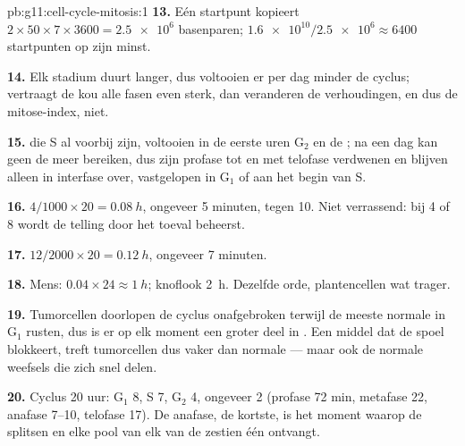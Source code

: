 \begin{solution}{pb:g11:cell-cycle-mitosis:1}
\textbf{13.} Eén startpunt kopieert $2 \times 50 \times 7 \times 3600 =
\num{2.5e6}$ basenparen; $\num{1.6e10}/\num{2.5e6} \approx 6400$
startpunten op zijn minst.

\textbf{14.} Elk stadium duurt langer, dus voltooien er per dag minder
 de cyclus; vertraagt de kou alle fasen even sterk, dan veranderen
de verhoudingen, en dus de mitose-index, niet.

\textbf{15.}  die S al voorbij zijn, voltooien in de eerste uren
$\mathrm{G_2}$ en de ; na een dag kan geen  de  meer
bereiken, dus zijn profase tot en met telofase verdwenen en blijven
alleen  in interfase over, vastgelopen in $\mathrm{G_1}$ of aan het
begin van S.

\textbf{16.} $4/1000 \times 20 = \qty{0.08}{h}$, ongeveer 5 minuten,
tegen 10. Niet verrassend: bij 4 of 8  wordt de telling door het
toeval beheerst.

\textbf{17.} $12/2000 \times 20 = \qty{0.12}{h}$, ongeveer 7 minuten.

\textbf{18.} Mens: $0.04 \times 24 \approx \qty{1}{h}$; knoflook
\qty{2}{h}. Dezelfde orde, plantencellen wat trager.

\textbf{19.} Tumorcellen doorlopen de cyclus onafgebroken terwijl de
meeste normale  in $\mathrm{G_1}$ rusten, dus is er op elk moment
een groter deel in . Een middel dat de spoel blokkeert, treft
tumorcellen dus vaker dan normale --- maar ook de normale weefsels die
zich snel delen.

\textbf{20.} Cyclus 20 uur: $\mathrm{G_1}$ 8, S 7, $\mathrm{G_2}$ 4,
 ongeveer 2 (profase 72 min, metafase 22, anafase 7--10, telofase
17). De anafase, de kortste, is het moment waarop de 
splitsen en elke pool van elk van de zestien  één 
ontvangt.
\end{solution}
